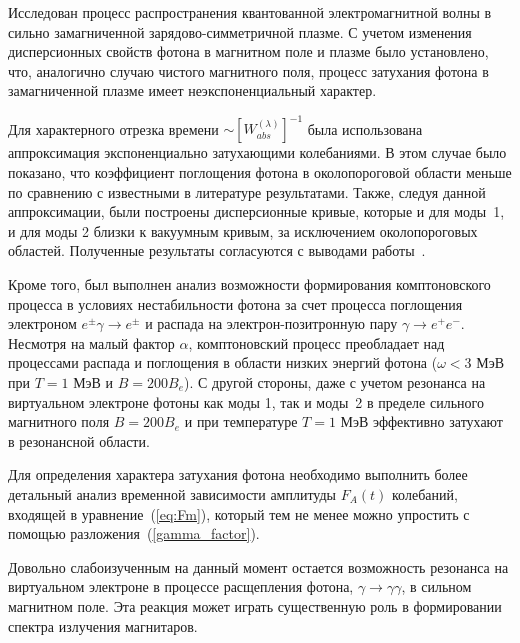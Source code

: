 Исследован процесс распространения квантованной электромагнитной волны в сильно замагниченной зарядово-симметричной плазме. С учетом изменения дисперсионных свойств фотона в магнитном поле и плазме было установлено, что, аналогично случаю чистого магнитного поля, процесс затухания фотона
в замагниченной плазме имеет неэкспоненциальный характер. 

Для характерного отрезка времени $\sim [W^{{(\lambda)}}_{abs}]^{-1}$ была использована аппроксимация экспоненциально затухающими колебаниями. В этом случае было
показано, что коэффициент поглощения фотона в околопороговой области меньше по сравнению с известными в литературе результатами. Также, следуя данной аппроксимации, были построены дисперсионные кривые, которые и для моды~1, и для моды 2 близки к вакуумным кривым, за исключением околопороговых областей. Полученные результаты согласуются с выводами работы~\cite{Shabad:1988}.

Кроме того, был выполнен анализ возможности формирования комптоновского процесса в условиях нестабильности фотона за счет процесса поглощения электроном $e^\pm\gamma\to e^\pm$ и распада на электрон-позитронную пару $\gamma\to e^+e^-$. Несмотря на малый фактор $\alpha$, комптоновский процесс преобладает над процессами распада и поглощения в области низких энергий фотона ($\omega<3$ МэВ при $T=1$ МэВ и $B =200B_e$). С другой стороны, даже с учетом резонанса на виртуальном электроне фотоны как моды 1, так и моды~2 в пределе сильного магнитного поля $B=200 B_e$ и при температуре $T=1$ МэВ эффективно затухают в резонансной области.

Для определения характера затухания фотона необходимо выполнить более детальный анализ временной зависимости амплитуды $F_A(t)$ колебаний, входящей в уравнение~(\ref{eq:Fm}), который тем не менее можно упростить с помощью разложения~(\ref{gamma_factor}).

Довольно слабоизученным на данный момент остается возможность резонанса на виртуальном электроне в процессе расщепления фотона, $\gamma\to \gamma \gamma$, в сильном магнитном поле. Эта реакция может играть существенную роль в формировании спектра излучения магнитаров.
